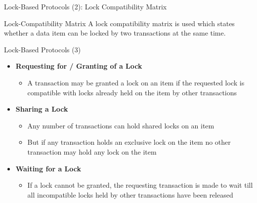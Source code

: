 \documentclass[aspectratio=169, xcolor=dvipsnames]{beamer}
\begin{document}
\begin{frame}{Lock-Based Protocols (2): Lock Compatibility Matrix}
    \begin{block}{Lock-Compatibility Matrix}
        A lock compatibility matrix is used which states whether a data item can be locked by two transactions at the same time.
    \end{block}
    \vspace{1em}
\end{frame}

\begin{frame}{Lock-Based Protocols (3)}
    \begin{itemize}[<+->]
        \item \textbf{Requesting for / Granting of a Lock}
        \begin{itemize}
            \item[$\triangleright$] A transaction may be granted a lock on an item if the requested lock is compatible with locks already held on the item by other transactions
        \end{itemize}
        \item \textbf{Sharing a Lock}
        \begin{itemize}
            \item[$\triangleright$] Any number of transactions can hold shared locks on an item
            \item[$\triangleright$] But if any transaction holds an exclusive lock on the item no other transaction may hold any lock on the item
        \end{itemize}
        \item \textbf{Waiting for a Lock}
        \begin{itemize}
            \item[$\triangleright$] If a lock cannot be granted, the requesting transaction is made to wait till all incompatible locks held by other transactions have been released
        \end{itemize}
    \end{itemize}
\end{frame}
\end{document}
